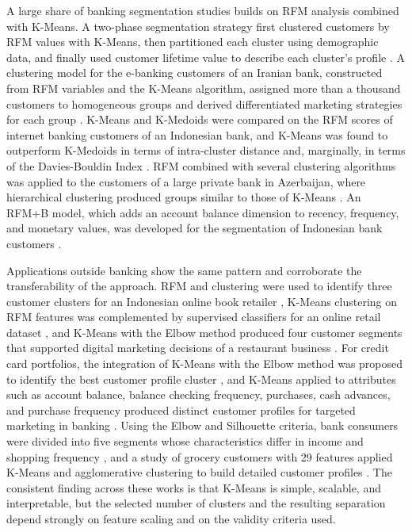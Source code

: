 \documentclass[conference]{IEEEtran}
\begin{document}
A large share of banking segmentation studies builds on RFM analysis combined with K-Means. A two-phase segmentation strategy first clustered customers by RFM values with K-Means, then partitioned each cluster using demographic data, and finally used customer lifetime value to describe each cluster's profile \cite{kumar2012}. A clustering model for the e-banking customers of an Iranian bank, constructed from RFM variables and the K-Means algorithm, assigned more than a thousand customers to homogeneous groups and derived differentiated marketing strategies for each group \cite{fouladifar2016}. K-Means and K-Medoids were compared on the RFM scores of internet banking customers of an Indonesian bank, and K-Means was found to outperform K-Medoids in terms of intra-cluster distance and, marginally, in terms of the Davies-Bouldin Index \cite{aryuni2018}. RFM combined with several clustering algorithms was applied to the customers of a large private bank in Azerbaijan, where hierarchical clustering produced groups similar to those of K-Means \cite{aliyev2020}. An RFM+B model, which adds an account balance dimension to recency, frequency, and monetary values, was developed for the segmentation of Indonesian bank customers \cite{firdaus2021}.

Applications outside banking show the same pattern and corroborate the transferability of the approach. RFM and clustering were used to identify three customer clusters for an Indonesian online book retailer \cite{singh2023}, K-Means clustering on RFM features was complemented by supervised classifiers for an online retail dataset \cite{kc2026}, and K-Means with the Elbow method produced four customer segments that supported digital marketing decisions of a restaurant business \cite{hasugian2026}. For credit card portfolios, the integration of K-Means with the Elbow method was proposed to identify the best customer profile cluster \cite{syakur2018integration}, and K-Means applied to attributes such as account balance, balance checking frequency, purchases, cash advances, and purchase frequency produced distinct customer profiles for targeted marketing in banking \cite{gopalakrishnan2024}. Using the Elbow and Silhouette criteria, bank consumers were divided into five segments whose characteristics differ in income and shopping frequency \cite{raiter2021}, and a study of grocery customers with 29 features applied K-Means and agglomerative clustering to build detailed customer profiles \cite{sinap2025}. The consistent finding across these works is that K-Means is simple, scalable, and interpretable, but the selected number of clusters and the resulting separation depend strongly on feature scaling and on the validity criteria used.
\end{document}

